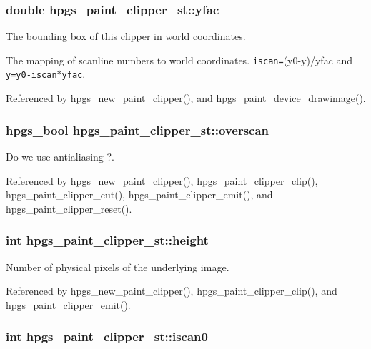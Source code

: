\subsubsection[yfac]{\setlength{\rightskip}{0pt plus 5cm}double {\bf hpgs\_\-paint\_\-clipper\_\-st::yfac}}\label{structhpgs__paint__clipper__st_0cdd33a5c1f522e1445d74fd18ec2da2}


The bounding box of this clipper in world coordinates.

The mapping of scanline numbers to world coordinates. {\tt iscan=}(y0-y)/yfac and {\tt y=y0-iscan$\ast$yfac}. 

Referenced by hpgs\_\-new\_\-paint\_\-clipper(), and hpgs\_\-paint\_\-device\_\-drawimage().
\subsubsection[overscan]{\setlength{\rightskip}{0pt plus 5cm}hpgs\_\-bool {\bf hpgs\_\-paint\_\-clipper\_\-st::overscan}}\label{structhpgs__paint__clipper__st_b0fe1dce067b9c2fdbceb38bbe496e02}


Do we use antialiasing ?. 

Referenced by hpgs\_\-new\_\-paint\_\-clipper(), hpgs\_\-paint\_\-clipper\_\-clip(), hpgs\_\-paint\_\-clipper\_\-cut(), hpgs\_\-paint\_\-clipper\_\-emit(), and hpgs\_\-paint\_\-clipper\_\-reset().
\subsubsection[height]{\setlength{\rightskip}{0pt plus 5cm}int {\bf hpgs\_\-paint\_\-clipper\_\-st::height}}\label{structhpgs__paint__clipper__st_86d0fcb90e48b744eeb3ac6ffcb287ed}


Number of physical pixels of the underlying image. 

Referenced by hpgs\_\-new\_\-paint\_\-clipper(), hpgs\_\-paint\_\-clipper\_\-clip(), and hpgs\_\-paint\_\-clipper\_\-emit().
\subsubsection[iscan0]{\setlength{\rightskip}{0pt plus 5cm}int {\bf hpgs\_\-paint\_\-clipper\_\-st::iscan0}}\label{structhpgs__paint__clipper__st_23f85f972d3629d30f8f032640d4b77e}


